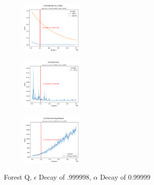 \documentclass[letterpaper]{article} %
\begin{document}
\begin{figure}[!htb]
	\centering
 	\begin{subfigure}[b]{0.175\textwidth}
		\includegraphics[width=1.2in]{Figures/Q_Forest_Epsilon__Alpha_Gamma_0_9__E_Dec_0_999998__A_Dec_0_99999.png}
  	\end{subfigure}%
	 \begin{subfigure}[b]{0.175\textwidth}
		\includegraphics[width=1.2in]{Figures/Q_Forest_Error_Gamma_0_9__E_Dec_0_999998__A_Dec_0_99999.png}
  	\end{subfigure}%
	\begin{subfigure}[b]{0.175\textwidth}
		\includegraphics[width=1.2in]{Figures/Q_Forest_Running_Reward_Gamma_0_9__E_Dec_0_999998__A_Dec_0_99999.png}
  	\end{subfigure}
\caption{Forest Q,  $\epsilon$ Decay of .999998, $\alpha$ Decay of 0.99999}
\label{fig:forest_q_e_999998_a_99999_rewards}
\end{figure}
\end{document}
